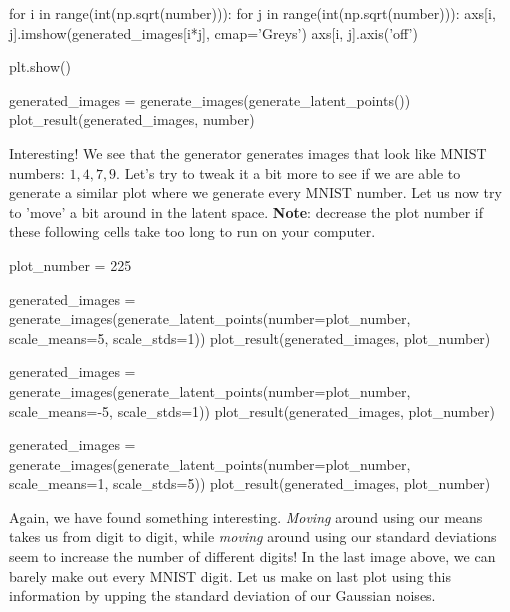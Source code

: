 \documentclass[%
oneside,                 %
final,                   %
10pt]{article}
\begin{document}
    for i in range(int(np.sqrt(number))):
        for j in range(int(np.sqrt(number))):
            axs[i, j].imshow(generated_images[i*j], cmap='Greys')
            axs[i, j].axis('off')

    plt.show()

\epycod





\bpycod
generated_images = generate_images(generate_latent_points())
plot_result(generated_images, number)

\epycod


Interesting! We see that the generator generates images that look like MNIST
numbers: $1, 4, 7, 9$. Let's try to tweak it a bit more to see if we are able
to generate a similar plot where we generate every MNIST number. Let us now try
to 'move' a bit around in the latent space. \textbf{Note}: decrease the plot number if
these following cells take too long to run on your computer.


















\bpycod
plot_number = 225

generated_images = generate_images(generate_latent_points(number=plot_number,
                                                          scale_means=5,
                                                          scale_stds=1))
plot_result(generated_images, plot_number)

generated_images = generate_images(generate_latent_points(number=plot_number,
                                                          scale_means=-5,
                                                          scale_stds=1))
plot_result(generated_images, plot_number)

generated_images = generate_images(generate_latent_points(number=plot_number,
                                                          scale_means=1,
                                                          scale_stds=5))
plot_result(generated_images, plot_number)

\epycod


Again, we have found something interesting. \emph{Moving} around using our means
takes us from digit to digit, while \emph{moving} around using our standard
deviations seem to increase the number of different digits! In the last image
above, we can barely make out every MNIST digit. Let us make on last plot using
this information by upping the standard deviation of our Gaussian noises.
\end{document}
